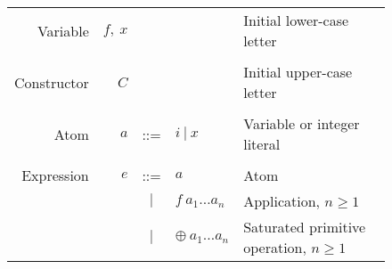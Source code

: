 \documentclass[11pt]{article}
\begin{document}
\setlength{\tabcolsep}{5pt}
\begin{figure}
\centering
\footnotesize %
\begin{tabular}{r r c l l}
Variable     & $f,\ x$        &     &                                              & Initial lower-case letter \\
\\
Constructor  & $C$            &     &                                              & Initial upper-case letter \\
\\
Atom         & $a$            & ::= & $i\ |\ x$                                    & Variable or integer literal\\
\\
Expression   & $e$            & ::= & $a$                                          & Atom \\
             &                & $|$ & $f\ a_1\dots a_n$                            & Application, $n\ge 1$ \\
             &                & $|$ & $\oplus\ a_1\dots a_n$                       & Saturated primitive operation, $n\ge 1$ \\


\end{tabular}
\end{figure}
\end{document}
